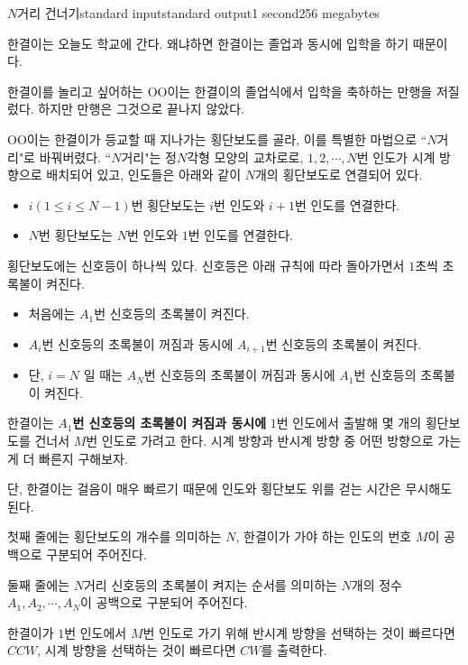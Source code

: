 \begin{problem}{$N$거리 건너기}{standard input}{standard output}{1 second}{256 megabytes}

한결이는 오늘도 학교에 간다. 왜냐하면 한결이는 졸업과 동시에 입학을 하기 때문이다.

한결이를 놀리고 싶어하는 OO이는 한결이의 졸업식에서 입학을 축하하는 만행을 저질렀다. 하지만 만행은 그것으로 끝나지 않았다.

OO이는 한결이가 등교할 때 지나가는 횡단보도를 골라, 이를 특별한 마법으로 ``$N$거리"로 바꿔버렸다. ``$N$거리"는 정$N$각형 모양의 교차로로, $1, 2, \cdots, N$번 인도가 시계 방향으로 배치되어 있고, 인도들은 아래와 같이 $N$개의 횡단보도로 연결되어 있다.

\begin{itemize}
    \item $i (1 \le i \le N-1)$번 횡단보도는 $i$번 인도와 $i+1$번 인도를 연결한다.
    \item $N$번 횡단보도는 $N$번 인도와 $1$번 인도를 연결한다.
\end{itemize}

횡단보도에는 신호등이 하나씩 있다. 신호등은 아래 규칙에 따라 돌아가면서 $1$초씩 초록불이 켜진다.

\begin{itemize}
    \item 처음에는 $A_1$번 신호등의 초록불이 켜진다.
    \item $A_i$번 신호등의 초록불이 꺼짐과 동시에 $A_{i+1}$번 신호등의 초록불이 켜진다.
    \item 단, $i = N$ 일 때는 $A_N$번 신호등의 초록불이 꺼짐과 동시에 $A_1$번 신호등의 초록불이 켜진다.
\end{itemize}

한결이는 \textbf{$A_1$번 신호등의 초록불이 켜짐과 동시에} $1$번 인도에서 출발해 몇 개의 횡단보도를 건너서 $M$번 인도로 가려고 한다. 시계 방향과 반시계 방향 중 어떤 방향으로 가는 게 더 빠른지 구해보자.

단, 한결이는 걸음이 매우 빠르기 때문에 인도와 횡단보도 위를 걷는 시간은 무시해도 된다.

\InputFile
첫째 줄에는 횡단보도의 개수를 의미하는 $N$, 한결이가 가야 하는 인도의 번호 $M$이 공백으로 구분되어 주어진다.

둘째 줄에는 $N$거리 신호등의 초록불이 켜지는 순서를 의미하는 $N$개의 정수 $A_1, A_2, \cdots, A_N$이 공백으로 구분되어 주어진다.

\OutputFile
한결이가 $1$번 인도에서 $M$번 인도로 가기 위해 반시계 방향을 선택하는 것이 빠르다면 $CCW$, 시계 방향을 선택하는 것이 빠르다면 $CW$를 출력한다.


\end{problem}
